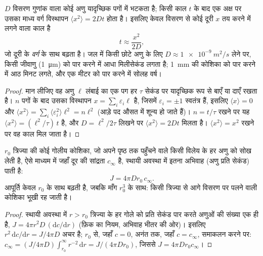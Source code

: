 \begin{theorem}\label{thm:b2:unicellular-diversity:diffusion}
$D$ विसरण गुणांक वाला कोई अणु यादृच्छिक पगों में भटकता है; किसी काल $t$ के
बाद एक अक्ष पर उसका माध्य वर्ग विस्थापन
$\langle x^2\rangle = 2Dt$ होता है। इसलिए केवल विसरण से कोई दूरी $x$ तय
करने में लगने वाला काल है
\[
t \approx \frac{x^2}{2D},
\]
जो दूरी के \emph{वर्ग} के साथ बढ़ता है। जल में किसी छोटे अणु के लिए
$D \approx \qty{1e-9}{m^2/s}$ लेने पर, किसी जीवाणु (\qty{1}{\micro m}) को
पार करने में आधा मिलीसेकंड लगता है; \qty{1}{mm} की कोशिका को पार करने में
आठ मिनट लगते, और एक मीटर को पार करने में सोलह वर्ष।
\end{theorem}
\begin{proof}
मान लीजिए वह अणु $\ell$ लंबाई का एक पग हर $\tau$ सेकंड पर यादृच्छिक रूप
से बाएँ या दाएँ रखता है। $n$ पगों के बाद उसका विस्थापन
$x = \sum_i \varepsilon_i \ell$ है, जिसमें $\varepsilon_i = \pm 1$
स्वतंत्र हैं, इसलिए $\langle x\rangle = 0$ और $\langle x^2\rangle =
\sum_i \langle\varepsilon_i^2\rangle \ell^2 = n\ell^2$ (आड़े पद
औसत में शून्य हो जाते हैं)। $n = t/\tau$ रखने पर यह $\langle x^2\rangle
= (\ell^2/\tau)\,t$ है, और $D = \ell^2/2\tau$ लिखने पर
$\langle x^2\rangle = 2Dt$ मिलता है। $\langle x^2\rangle = x^2$ रखने पर
वह काल मिल जाता है।
\end{proof}

\begin{theorem}[किसी गोलीय कोशिका को विसरण से आपूर्ति]\label{thm:b2:unicellular-diversity:supply}
$r_0$ त्रिज्या की कोई गोलीय कोशिका, जो अपने पृष्ठ तक पहुँचने वाले किसी
विलेय के हर अणु को सोख लेती है, ऐसे माध्यम में जहाँ दूर की सांद्रता
$c_\infty$ है, स्थायी अवस्था में इतना अभिवाह (अणु प्रति सेकंड) पाती है:
\[
J = 4\pi D r_0\, c_\infty .
\]
आपूर्ति केवल $r_0$ के साथ बढ़ती है, जबकि माँग $r_0^3$ के साथ: किसी
त्रिज्या से आगे विसरण पर पलने वाली कोशिका भूखी रह जाती है।
\end{theorem}
\begin{proof}
स्थायी अवस्था में $r > r_0$ त्रिज्या के हर गोले को प्रति सेकंड पार करते
अणुओं की संख्या एक ही है, $J = 4\pi r^2 D\,
(\mathrm{d}c/\mathrm{d}r)$ (फ़िक का नियम, अभिवाह भीतर की ओर)।
इसलिए $r^2\,\mathrm{d}c/\mathrm{d}r = J/4\pi D$ अचर है; $r_0$ से, जहाँ
$c = 0$, अनंत तक, जहाँ $c = c_\infty$, समाकलन करने पर:
$c_\infty = (J/4\pi D)\int_{r_0}^{\infty} r^{-2}\,\mathrm{d}r =
J/(4\pi D r_0)$, जिससे $J = 4\pi D r_0 c_\infty$।
\end{proof}

